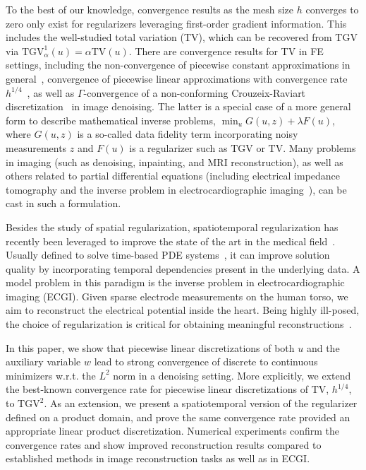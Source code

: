 \documentclass{article}
\newcommand{\TGV}{\mathrm{TGV}}
\newcommand{\TV}{\mathrm{TV}}
\begin{document}
	To the best of our knowledge, convergence results as the mesh size $h$ converges to zero only exist for regularizers leveraging first-order gradient information.
	This includes the well-studied total variation (TV), which can be recovered from TGV via $\TGV_\alpha^1(u) = \alpha \TV(u)$.
	There are convergence results for TV in FE settings, including the non-convergence of piecewise constant approximations in general~\cite{Ba12}, convergence of piecewise linear approximations with convergence rate $h^{1/4}$~\cite{Ba14}, as well as $\Gamma$-convergence of a non-conforming Crouzeix-Raviart discretization~\cite{Ch20} in image denoising.
	The latter is a special case of a more general form to describe mathematical inverse problems, $\min_{u} G(u, z) + \lambda F(u)$, where $G(u, z )$ is a so-called data fidelity term incorporating noisy measurements $z$ and $F(u)$ is a regularizer such as $\TGV$ or $\TV$.
	Many problems in imaging (such as denoising, inpainting, and MRI reconstruction), as well as others related to partial differential equations (including electrical impedance tomography and the inverse problem in electrocardiographic imaging~\cite{Fr14}), can be cast in such a formulation.
	
	Besides the study of spatial regularization, spatiotemporal regularization has recently been leveraged to improve the state of the art in the medical field~\cite{Bu25, Ha25, On09}.
	Usually defined to solve time-based PDE systems~\cite[Chapter~6]{Er04}, it can improve solution quality by incorporating temporal dependencies present in the underlying data.
	A model problem in this paradigm is the inverse problem in electrocardiographic imaging (ECGI).
	Given sparse electrode measurements on the human torso, we aim to reconstruct the electrical potential inside the heart.
	Being highly ill-posed, the choice of regularization is critical for obtaining meaningful reconstructions~\cite{La26, Wa13}.
	
	In this paper, we show that piecewise linear discretizations of both $u$ and the auxiliary variable $w$ lead to strong convergence of discrete to continuous minimizers w.r.t. the $L^2$ norm in a denoising setting.
	More explicitly, we extend the best-known convergence rate for piecewise linear discretizations of $\TV$, $h^{1/4}$, to $\TGV^2$.
	As an extension, we present a spatiotemporal version of the regularizer defined on a product domain, and prove the same convergence rate provided an appropriate linear product discretization. 
	Numerical experiments confirm the convergence rates and show improved reconstruction results compared to established methods in image reconstruction tasks as well as in ECGI.
	
\end{document}
